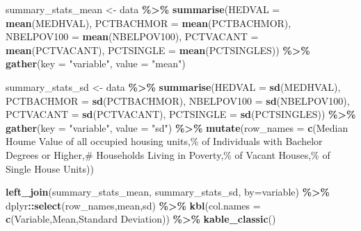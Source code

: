 \documentclass[
]{article}
\newenvironment{Shaded}{\begin{snugshade}}{\end{snugshade}}
\newcommand{\AttributeTok}[1]{\textcolor[rgb]{0.13,0.29,0.53}{#1}}
\newcommand{\FunctionTok}[1]{\textcolor[rgb]{0.13,0.29,0.53}{\textbf{#1}}}
\newcommand{\NormalTok}[1]{#1}
\newcommand{\OtherTok}[1]{\textcolor[rgb]{0.56,0.35,0.01}{#1}}
\newcommand{\SpecialCharTok}[1]{\textcolor[rgb]{0.81,0.36,0.00}{\textbf{#1}}}
\newcommand{\StringTok}[1]{\textcolor[rgb]{0.31,0.60,0.02}{#1}}
\begin{document}
\begin{Shaded}
\begin{Highlighting}[]
\NormalTok{summary\_stats\_mean }\OtherTok{\textless{}{-}}\NormalTok{ data }\SpecialCharTok{\%\textgreater{}\%}
  \FunctionTok{summarise}\NormalTok{(}\AttributeTok{HEDVAL =} \FunctionTok{mean}\NormalTok{(MEDHVAL),}
            \AttributeTok{PCTBACHMOR =} \FunctionTok{mean}\NormalTok{(PCTBACHMOR),}
            \AttributeTok{NBELPOV100 =} \FunctionTok{mean}\NormalTok{(NBELPOV100),}
            \AttributeTok{PCTVACANT =} \FunctionTok{mean}\NormalTok{(PCTVACANT),}
            \AttributeTok{PCTSINGLE =} \FunctionTok{mean}\NormalTok{(PCTSINGLES)) }\SpecialCharTok{\%\textgreater{}\%}
  \FunctionTok{gather}\NormalTok{(}\AttributeTok{key =} \StringTok{"variable"}\NormalTok{, }\AttributeTok{value =} \StringTok{"mean"}\NormalTok{)}
            
\NormalTok{summary\_stats\_sd }\OtherTok{\textless{}{-}}\NormalTok{ data }\SpecialCharTok{\%\textgreater{}\%}
  \FunctionTok{summarise}\NormalTok{(}\AttributeTok{HEDVAL =} \FunctionTok{sd}\NormalTok{(MEDHVAL),}
            \AttributeTok{PCTBACHMOR =} \FunctionTok{sd}\NormalTok{(PCTBACHMOR),}
            \AttributeTok{NBELPOV100 =} \FunctionTok{sd}\NormalTok{(NBELPOV100),}
            \AttributeTok{PCTVACANT =} \FunctionTok{sd}\NormalTok{(PCTVACANT),}
            \AttributeTok{PCTSINGLE =} \FunctionTok{sd}\NormalTok{(PCTSINGLES)) }\SpecialCharTok{\%\textgreater{}\%}
  \FunctionTok{gather}\NormalTok{(}\AttributeTok{key =} \StringTok{"variable"}\NormalTok{, }\AttributeTok{value =} \StringTok{"sd"}\NormalTok{) }\SpecialCharTok{\%\textgreater{}\%}
  \FunctionTok{mutate}\NormalTok{(}\AttributeTok{row\_names =} \FunctionTok{c}\NormalTok{(}\StringTok{\textquotesingle{}Median Houme Value of all occupied housing units\textquotesingle{}}\NormalTok{,}\StringTok{\textquotesingle{}\% of Individuals with Bachelor Degrees or Higher\textquotesingle{}}\NormalTok{,}\StringTok{\textquotesingle{}\# Households Living in Poverty\textquotesingle{}}\NormalTok{,}\StringTok{\textquotesingle{}\% of Vacant Houses\textquotesingle{}}\NormalTok{,}\StringTok{\textquotesingle{}\% of Single House Units\textquotesingle{}}\NormalTok{)) }

\FunctionTok{left\_join}\NormalTok{(summary\_stats\_mean, summary\_stats\_sd, }\AttributeTok{by=}\StringTok{\textquotesingle{}variable\textquotesingle{}}\NormalTok{) }\SpecialCharTok{\%\textgreater{}\%}
\NormalTok{  dplyr}\SpecialCharTok{::}\FunctionTok{select}\NormalTok{(}\StringTok{\textquotesingle{}row\_names\textquotesingle{}}\NormalTok{,}\StringTok{\textquotesingle{}mean\textquotesingle{}}\NormalTok{,}\StringTok{\textquotesingle{}sd\textquotesingle{}}\NormalTok{) }\SpecialCharTok{\%\textgreater{}\%}
  \FunctionTok{kbl}\NormalTok{(}\AttributeTok{col.names =} \FunctionTok{c}\NormalTok{(}\StringTok{\textquotesingle{}Variable\textquotesingle{}}\NormalTok{,}\StringTok{\textquotesingle{}Mean\textquotesingle{}}\NormalTok{,}\StringTok{\textquotesingle{}Standard Deviation\textquotesingle{}}\NormalTok{)) }\SpecialCharTok{\%\textgreater{}\%}
  \FunctionTok{kable\_classic}\NormalTok{()}
\end{Highlighting}
\end{Shaded}
\end{document}
